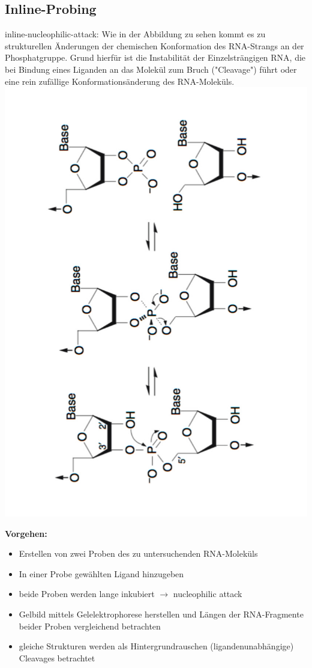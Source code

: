 \subsection{Inline-Probing}
inline-nucleophilic-attack: Wie in der Abbildung zu sehen kommt es zu strukturellen Änderungen der chemischen Konformation des RNA-Strangs an der Phosphatgruppe. Grund hierfür ist die Instabilität der Einzelsträngigen RNA, die bei Bindung eines Liganden an das Molekül zum Bruch ("Cleavage") führt oder eine rein zufällige Konformationsänderung des RNA-Moleküls. \\
\includegraphics[scale=0.25,angle=270]{lectures/160513/pix/inline.jpg}

\textbf{Vorgehen:}
\begin{itemize}
\item Erstellen von zwei Proben des zu untersuchenden RNA-Moleküls
\item In einer Probe gewählten Ligand hinzugeben
\item beide Proben werden lange inkubiert $\rightarrow$ nucleophilic attack
\item Gelbild mittels Gelelektrophorese herstellen und Längen der RNA-Fragmente beider Proben vergleichend betrachten
\item gleiche Strukturen werden als Hintergrundrauschen (ligandenunabhängige) Cleavages betrachtet
\end{itemize}

